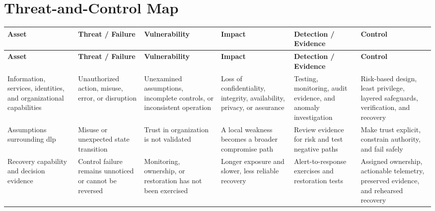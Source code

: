 \documentclass[11pt]{article}
\begin{document}
\section*{Threat-and-Control Map}
\begingroup\scriptsize\setlength{\tabcolsep}{2pt}
\begin{longtable}{>{\RaggedRight\arraybackslash}p{}>{\RaggedRight\arraybackslash}p{}>{\RaggedRight\arraybackslash}p{}>{\RaggedRight\arraybackslash}p{}>{\RaggedRight\arraybackslash}p{}>{\RaggedRight\arraybackslash}p{}}
\toprule\rowcolor{Navy}\color{white}\textbf{Asset} & \color{white}\textbf{Threat / Failure} & \color{white}\textbf{Vulnerability} & \color{white}\textbf{Impact} & \color{white}\textbf{Detection / Evidence} & \color{white}\textbf{Control}\\\midrule
\endfirsthead
\toprule\rowcolor{Navy}\color{white}\textbf{Asset} & \color{white}\textbf{Threat / Failure} & \color{white}\textbf{Vulnerability} & \color{white}\textbf{Impact} & \color{white}\textbf{Detection / Evidence} & \color{white}\textbf{Control}\\\midrule
\endhead
Information, services, identities, and organizational capabilities & Unauthorized action, misuse, error, or disruption & Unexamined assumptions, incomplete controls, or inconsistent operation & Loss of confidentiality, integrity, availability, privacy, or assurance & Testing, monitoring, audit evidence, and anomaly investigation & Risk-based design, least privilege, layered safeguards, verification, and recovery\\\midrule
Assumptions surrounding dlp & Misuse or unexpected state transition & Trust in organization is not validated & A local weakness becomes a broader compromise path & Review evidence for risk and test negative paths & Make trust explicit, constrain authority, and fail safely\\\midrule
Recovery capability and decision evidence & Control failure remains unnoticed or cannot be reversed & Monitoring, ownership, or restoration has not been exercised & Longer exposure and slower, less reliable recovery & Alert-to-response exercises and restoration tests & Assigned ownership, actionable telemetry, preserved evidence, and rehearsed recovery\\\midrule
\bottomrule
\end{longtable}
\endgroup
\end{document}
